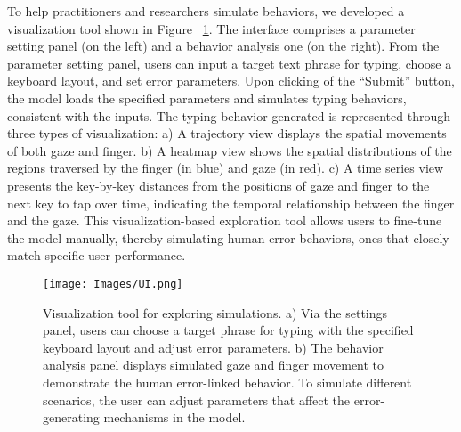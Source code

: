 To help practitioners and researchers simulate behaviors, we developed a visualization tool shown in Figure ~\ref{fig:UI}. 
The interface comprises a parameter setting panel (on the left) and a behavior analysis one (on the right). From the parameter setting panel, users can input a target text phrase for typing, choose a keyboard layout, and set error parameters. Upon clicking of the ``Submit'' button, the model loads the specified parameters and simulates typing behaviors, consistent with the inputs. The typing behavior generated is represented through three types of visualization:  a) A trajectory view displays the spatial movements of both gaze and finger. b) A heatmap view shows the spatial distributions of the regions traversed by the finger (in blue) and gaze (in red). c) A time series view presents the key-by-key distances from the positions of gaze and finger to the next key to tap over time, indicating the temporal relationship between the finger and the gaze. This visualization-based exploration tool allows users to fine-tune the model manually, thereby simulating human error behaviors, ones that closely match specific user performance.

\begin{figure}[!t]
\centering
  \texttt{[image: Images/UI.png]}
  \caption{Visualization tool for exploring simulations. a) Via the settings panel, users can choose a target phrase for typing with the specified keyboard layout and adjust error parameters. b) The behavior analysis panel displays simulated gaze and finger movement to demonstrate the human error-linked behavior. To simulate different scenarios, the user can adjust parameters that affect the error-generating mechanisms in the model.}
  \label{fig:UI}
\end{figure}